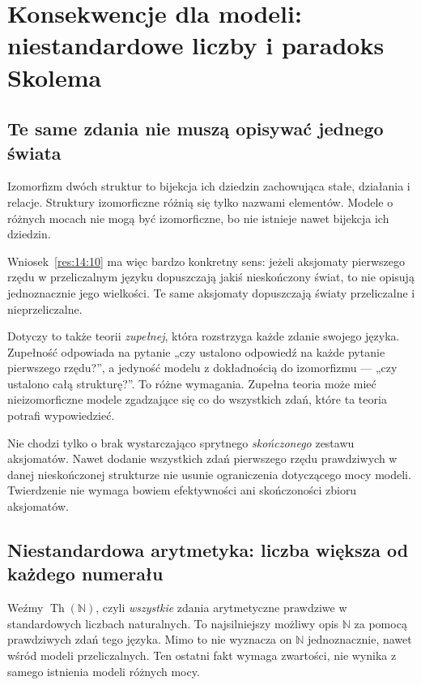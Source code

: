 \section{Konsekwencje dla modeli: niestandardowe liczby i paradoks Skolema}\label{sec:modele-konsekwencje}
\subsection*{Te same zdania nie muszą opisywać jednego świata}\label{sec:15:1}
Izomorfizm dwóch struktur to bijekcja ich dziedzin zachowująca stałe, działania i relacje. Struktury izomorficzne różnią się tylko nazwami elementów. Modele o różnych mocach nie mogą być izomorficzne, bo nie istnieje nawet bijekcja ich dziedzin.

Wniosek~\ref{res:14:10} ma więc bardzo konkretny sens: jeżeli aksjomaty pierwszego rzędu w przeliczalnym języku dopuszczają jakiś nieskończony świat, to nie opisują jednoznacznie jego wielkości. Te same aksjomaty dopuszczają światy przeliczalne i nieprzeliczalne.

Dotyczy to także teorii \emph{zupełnej}, która rozstrzyga każde zdanie swojego języka. Zupełność odpowiada na pytanie „czy ustalono odpowiedź na każde pytanie pierwszego rzędu?”, a jedyność modelu z dokładnością do izomorfizmu --- „czy ustalono całą strukturę?”. To różne wymagania. Zupełna teoria może mieć nieizomorficzne modele zgadzające się co do wszystkich zdań, które ta teoria potrafi wypowiedzieć.

Nie chodzi tylko o brak wystarczająco sprytnego \emph{skończonego} zestawu aksjomatów. Nawet dodanie wszystkich zdań pierwszego rzędu prawdziwych w danej nieskończonej strukturze nie usunie ograniczenia dotyczącego mocy modeli. Twierdzenie nie wymaga bowiem efektywności ani skończoności zbioru aksjomatów.

\subsection*{Niestandardowa arytmetyka: liczba większa od każdego numerału}\label{sec:15:2}
Weźmy $\operatorname{Th}(\mathbb N)$, czyli \emph{wszystkie} zdania arytmetyczne prawdziwe w standardowych liczbach naturalnych. To najsilniejszy możliwy opis $\mathbb N$ za pomocą prawdziwych zdań tego języka. Mimo to nie wyznacza on $\mathbb N$ jednoznacznie, nawet wśród modeli przeliczalnych. Ten ostatni fakt wymaga zwartości, nie wynika z samego istnienia modeli różnych mocy.

